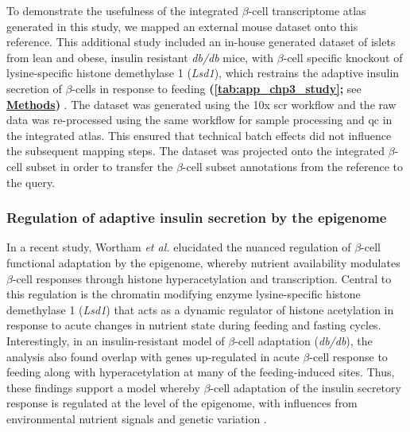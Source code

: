 \par To demonstrate the usefulness of the integrated $\beta$-cell transcriptome atlas generated in this study, we mapped an external mouse dataset onto this reference. This additional study included an in-house generated dataset of islets from lean and obese, insulin resistant \textit{db/db} mice, with $\beta$-cell specific knockout of lysine-specific histone demethylase 1 (\textit{Lsd1}), which restrains the adaptive insulin secretion of $\beta$-cells in response to feeding \textbf{(\autoref{tab:app_chp3_study};} see \hyperref[subsubsec:met_chp3_data]{\textbf{Methods}}\textbf{)} \textbf{\cite{wortham_nutrient_2023}}. The dataset was generated using the 10x \gls{scr} workflow and the raw data was re-processed using the same workflow for sample processing and \gls{qc} in the integrated atlas. This ensured that technical batch effects did not influence the subsequent mapping steps. The dataset was projected onto the integrated $\beta$-cell subset in order to transfer the $\beta$-cell subset annotations from the reference to the query.

\subsubsection{\large Regulation of adaptive insulin secretion by the epigenome}

In a recent study, Wortham \textit{et al.} elucidated the nuanced regulation of $\beta$-cell functional adaptation by the epigenome, whereby nutrient availability modulates $\beta$-cell responses through histone hyperacetylation and transcription. Central to this regulation is the chromatin modifying enzyme lysine-specific histone demethylase 1 (\textit{Lsd1}) that acts as a dynamic regulator of histone acetylation in response to acute changes in nutrient state during feeding and fasting cycles. Interestingly, in an insulin-resistant model of $\beta$-cell adaptation (\textit{db/db}), the analysis also found overlap with genes up-regulated in acute $\beta$-cell response to feeding along with hyperacetylation at many of the feeding-induced sites. Thus, these findings support a model whereby $\beta$-cell adaptation of the insulin secretory response is regulated at the level of the epigenome, with influences from environmental nutrient signals and genetic variation \textbf{\cite{wortham_nutrient_2023,aamodt_peeling_2023}}.


